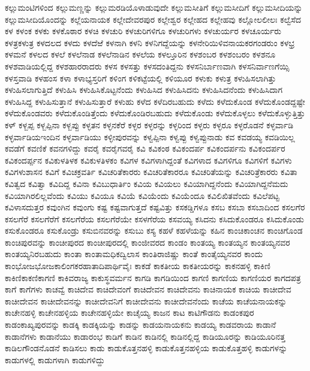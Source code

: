 {ಕಲ್ಲುಮಂಟಿಗಳಿಂದ
ಕಲ್ಲುಮಣ್ಣನ್ನು
ಕಲ್ಲುಮರಡಿಯೊಳಾಡುವುದೇ
ಕಲ್ಲುಮಸೀತಿಗೆ
ಕಲ್ಲುಮಸೀದಿಗೆ
ಕಲ್ಲುಮಸೀದಿಯನ್ನು
ಕಲ್ಲುಮಸೀದಿಯೊಂದನ್ನು
ಕಲ್ಲೆಯನಾಯಕ
ಕಲ್ಲೇದೇವರಪುರ
ಕಲ್ಲೇಶ್ವರ
ಕಲ್ಲೇಹದ
ಕಲ್ಲೇಹವು
ಕಲ್ಲೋಲಲೀಲಃ
ಕಲ್ವೆಸೆದ
ಕಳ
ಕಳಂಕ
ಕಳಕು
ಕಳಕೊಠಾರ
ಕಳಚಿ
ಕಳಚುರಿ
ಕಳಚುರಿಗಳಿಗೂ
ಕಳಚುರಿಗಳು
ಕಳಚುರ್ಯರ
ಕಳಚೂರ್ಯರು
ಕಳತ್ರಕಳುತ್ರ
ಕಳದಲದ
ಕಳದು
ಕಳದೆಱೆ
ಕಳನಾಗಿ
ಕಳನಿ
ಕಳನಿಗದ್ದೆಯನ್ನು
ಕಳನೇರಿಯಿಳಿವನಾಯಕರಗಂಡರುಂ
ಕಳಭ್ರ
ಕಳಮನೆ
ಕಳಲದ
ಕಳಲೆ
ಕಳಲೆನಾಡ
ಕಳಲೆನಾಡಿನ
ಕಳಲೆಯ
ಕಳಲ್ತೂರಿನ
ಕಳಶಂಬರ
ಕಳಶಂಬರಂ
ಕಳಶನೂ
ಕಳಶವಾಡಿಯಲ್ಲಿದ್ದ
ಕಳಶಹಾರರಾದರು
ಕಳಸ
ಕಳಸತ್ತು
ಕಳಸದಂತಿದ್ದನು
ಕಳಸನಿರ್ಬಾಣವಾಗಿ
ಕಳಸನಿರ್ವಾಣಗೆಯ್ಸಿ
ಕಳಸ್ತವಾಡಿ
ಕಳಹಂಸ
ಕಳಾ
ಕಳಾಭ್ಯಸ್ತರಿಗೆ
ಕಳಿಂಗ
ಕಳಿಕಟ್ಟೆಯಲ್ಲಿ
ಕಳಿಯೂರ
ಕಳುಕು
ಕಳುತ್ರ
ಕಳುಹಿಸಲಾಗಿತ್ತು
ಕಳುಹಿಸಲಾಗುತ್ತಿದೆ
ಕಳುಹಿಸಿ
ಕಳುಹಿಸಿಕೊಟ್ಟನೆಂದು
ಕಳುಹಿಸಿದ
ಕಳುಹಿಸಿದನು
ಕಳುಹಿಸಿದನೆಂದು
ಕಳುಹಿಸಿದಾಗ
ಕಳುಹಿಸಿದ್ದ
ಕಳುಹಿಸುತ್ತಾನೆ
ಕಳುಹಿಸುತ್ತಾರೆ
ಕಳುಹು
ಕಳೆದ
ಕಳೆದಿರಬಹುದು
ಕಳೆದು
ಕಳೆದುಕೊಂಡ
ಕಳೆದುಕೊಂಡದ್ದಷ್ಟೇ
ಕಳೆದುಕೊಂಡವರು
ಕಳೆದುಕೊಂಡಿತ್ತೆಂದು
ಕಳೆದುಕೊಂಡಿರಬಹುದು
ಕಳೆದುಕೊಂಡು
ಕಳೆದುಕೊಳ್ಳಲು
ಕಳೆದುಕೊಳ್ಳುತ್ತಿತ್ತು
ಕಳ್
ಕಳ್ಬಪ್ಪ
ಕಳ್ಬಪ್ಪಿನಾ
ಕಳ್ಬಪ್ಪು
ಕಳ್ಳತನ
ಕಳ್ಳನಕೆರೆ
ಕಳ್ಳರ
ಕಳ್ಳರನ್ನು
ಕಳ್ಳರಿಂದ
ಕಳ್ಳರು
ಕಳ್ಳರೂ
ಕಳ್ಳರೊಡನೆ
ಕಳ್ಳರ್ವಾಡಿ
ಕಳ್ಳರ್ವಾಡಿಯಇಂದಿನ
ಕಳ್ಳರ್ವಾಡಿಯು
ಕಳ್ಳೀಪುರವನ್ನು
ಕಳ್ವಪ್ಪಿನಾ
ಕಳ್ವಪ್ಪು
ಕಳ್ವಪ್ಪುನಾಡು
ಕವ
ಕವಡಯ್ಯ
ಕವಡಿಯಿಲ್ಲ
ಕವಡೆಗೆ
ಕವಣಿಕೆ
ಕವನಗಳಿದ್ದು
ಕವರೈ
ಕವರೈಗವರೈ
ಕವಿ
ಕವಿಕಂಠ
ಕವಿಕಂದರ್ಪ
ಕವಿಕಂದರ್ಪನು
ಕವಿಕಂದರ್ಪರ
ಕವಿಕಂದರ್ಪ್ಪನ
ಕವಿಕುಳತಿಳಕ
ಕವಿಕುಳತಿಳಕಂ
ಕವಿಗಳ
ಕವಿಗಳಾಗಿದ್ದಂತೆ
ಕವಿಗಳಾದ
ಕವಿಗಳಿಗೂ
ಕವಿಗಳಿಗೆ
ಕವಿಗಳು
ಕವಿಗಳುಶಾಸನ
ಕವಿಗೆ
ಕವಿಚಕ್ರವರ್ತಿ
ಕವಿಚರಿತೆಕಾರರು
ಕವಿಚರಿತೆಕಾರರೂ
ಕವಿಚರಿತೆಯನ್ನು
ಕವಿಚರಿತ್ರೆಕಾರರು
ಕವಿತಾ
ಕವಿತ್ವದ
ಕವಿತ್ವಾ
ಕವಿದಿದ್ದ
ಕವಿನಾ
ಕವಿಬುಧಾರ್ತಿಂ
ಕವಿಯ
ಕವಿಯಲು
ಕವಿಯಾಗಿದ್ದನೆಂದು
ಕವಿಯಾಗಿದ್ದನೆಮದು
ಕವಿಯಾಗಿರಲಿಲ್ಲವೆಂದು
ಕವಿಯು
ಕವಿಯೂ
ಕವಿಯೆ
ಕವಿಯೆಂದು
ಕವಿಯೆಂದೂ
ಕವಿಲಿಖಿತವೆಂದು
ಕವಿಲೆಪಟ್ಟ
ಕವಿಳಾಸದುತ್ತರ
ಕವುಂಗಿನ
ಕವುಂಗು
ಕಷ್ಟ
ಕಷ್ಟವಾಗುತ್ತದೆ
ಕಷ್ಟವಿತ್ತು
ಕಸಕಡ್ಡಿಗಳೂ
ಕಸಬ
ಕಸಬಾ
ಕಸಬಾದಿಂದ
ಕಸಲಗೆರ
ಕಸಲಗೆರೆ
ಕಸಲಗೆರೆಗೆ
ಕಸಲಗೆರೆಯ
ಕಸಲಗೆರೆಯೇ
ಕಸಳಗೆರೆಯ
ಕಸವಯ್ಯ
ಕಸಿದನು
ಕಸಿದುಕೊಂಡರೂ
ಕಸಿದುಕೊಂಡು
ಕಸುಕೊಂಡರೂ
ಕಸುಕೊಂಡ್ರು
ಕಸುಬಿನವರನ್ನು
ಕಸುಬು
ಕಸ್ಯ
ಕಹಳೆ
ಕಹಳೆಯನ್ನು
ಕಹಿನ
ಕಾಂಚಿಕಾಂಚನ
ಕಾಂಚಿಗೊಂಡ
ಕಾಂಚಿಪುರವನ್ನು
ಕಾಂಚೀಪುರದ
ಕಾಂಚೀಪುರದಲ್ಲಿ
ಕಾಂಜೀವರದ
ಕಾಂಡಂ
ಕಾಂತಯ್ಯ
ಕಾಂತಯ್ಯನ
ಕಾಂತಯ್ಯನವರ
ಕಾಂತಯ್ಯನಿರಬಹುದು
ಕಾಂತಾ
ಕಾಂತಾಮಧಿಕದ್ವಿಲಾಸ
ಕಾಂತಿರಾಜಿಷ್ಣು
ಕಾಂತೆ
ಕಾಂತೈಯ್ಯನವರ
ಕಾಂದು
ಕಾಂಭೋಜಭೋಜಕಾಲಿಂಗಕರಹಾತಾದಿಪಾರ್ಥಿವೈಃ
ಕಾಕಡೆ
ಕಾಕತೀಯ
ಕಾಕತೀಯರನ್ನು
ಕಾಕನಹಳ್ಳಿ
ಕಾಕಿಣಿ
ಕಾಕಿಣಿಕಾಕಣಿಕಾಗಣಿ
ಕಾಕಿವರಾಜ್ಯ
ಕಾಕುಸ್ಥವರ್ಮನ
ಕಾಗಡಿ
ಕಾಗಡಿಯಿಂದ
ಕಾಗಣಿ
ಕಾಗಣಿಯ
ಕಾಗಣಿಯರ
ಕಾಗದಪತ್ರ
ಕಾಗೆ
ಕಾಗೆಗಳು
ಕಾಚವ್ವೆ
ಕಾಚಿದೇವ
ಕಾಚಿದೇವಂಗೆ
ಕಾಚಿದೇವನ
ಕಾಚಿದೇವನು
ಕಾಚಿನಾಯಕ
ಕಾಚಿಯ
ಕಾಚೀದೇವ
ಕಾಚೀದೇವನ
ಕಾಚೀದೇವನನ್ನು
ಕಾಚೀದೇವನಿಗೆ
ಕಾಚೀದೇವನು
ಕಾಚೀದೇವನೆಂದು
ಕಾಚೆಯ
ಕಾಚೆಯನಾಯಕನ್ನು
ಕಾಚೇನಹಳ್ಳಿ
ಕಾಚೇನಹಳ್ಳಿಯ
ಕಾಚೇನಹಳ್ಳಿಯೇ
ಕಾಚೈಯ್ಯ
ಕಾಜನ
ಕಾಟ
ಕಾಟಿಗೌಡನು
ಕಾಡಂಕಪುರ
ಕಾಡಂಕಾಖ್ಯಪುರವನ್ನು
ಕಾಡಕ್ಕಿ
ಕಾಡಕ್ಕಿಯನ್ನು
ಕಾಡನ್ನು
ಕಾಡಯನಾಯಕನು
ಕಾಡಯ್ಯ
ಕಾಡವರಾಯ
ಕಾಡಾನೆ
ಕಾಡಾನೆಗಳು
ಕಾಡಾನೆಯು
ಕಾಡಾರಂಭ
ಕಾಡಿಗೆ
ಕಾಡಿನ
ಕಾಡಿನಲ್ಲಿ
ಕಾಡಿನಲ್ಲಿದ್ದ
ಕಾಡಿಯೂರನ್ನು
ಕಾಡಿಯೂರಿನತ್ತ
ಕಾಡಿಲಗೌಂಡನೊಡನೆ
ಕಾಡಿಸಲು
ಕಾಡು
ಕಾಡುಕೊತ್ತನಹಳ್ಳಿ
ಕಾಡುಕೊತ್ತನಹಳ್ಳಿಯ
ಕಾಡುಕೊತ್ತಹಳ್ಳಿ
ಕಾಡುಗಳನ್ನು
ಕಾಡುಗಳಲ್ಲಿ
ಕಾಡುಗಳಾಗಿ
ಕಾಡುಗಳಿದ್ದು
}

